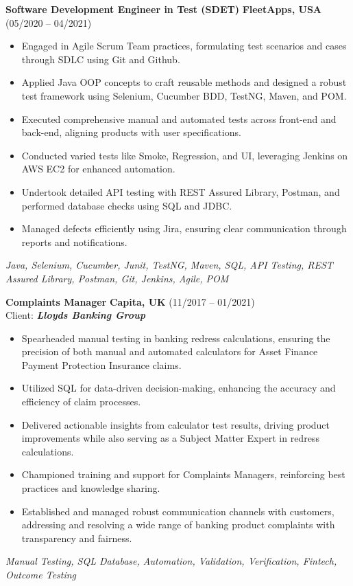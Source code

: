 \documentclass[11pt,a4paper,sans]{moderncv}
\begin{document}
    \noindent \textbf{Software Development Engineer in Test (SDET)} \hfill \textbf{FleetApps, USA} (05/2020 – 04/2021) \\
    \begin{itemize}
        \item Engaged in Agile Scrum Team practices, formulating test scenarios and cases through SDLC using Git and Github.
        \item Applied Java OOP concepts to craft reusable methods and designed a robust test framework using Selenium, Cucumber BDD, TestNG, Maven, and POM.
        \item Executed comprehensive manual and automated tests across front-end and back-end, aligning products with user specifications.
        \item Conducted varied tests like Smoke, Regression, and UI, leveraging Jenkins on AWS EC2 for enhanced automation.
        \item Undertook detailed API testing with REST Assured Library, Postman, and performed database checks using SQL and JDBC.
        \item Managed defects efficiently using Jira, ensuring clear communication through reports and notifications.
    \end{itemize}
    \small \textit{Java, Selenium, Cucumber, Junit, TestNG, Maven, SQL, API Testing, REST Assured Library, Postman, Git, Jenkins, Agile, POM}



    \noindent \textbf{Complaints Manager} \hfill \textbf{Capita, UK} (11/2017 – 01/2021) \\
    \small Client: \textbf{\textit{Lloyds Banking Group}} \\
    \begin{itemize}
        \item Spearheaded manual testing in banking redress calculations, ensuring the precision of both manual and automated calculators for Asset Finance Payment Protection Insurance claims.
        \item Utilized SQL for data-driven decision-making, enhancing the accuracy and efficiency of claim processes.
        \item Delivered actionable insights from calculator test results, driving product improvements while also serving as a Subject Matter Expert in redress calculations.
        \item Championed training and support for Complaints Managers, reinforcing best practices and knowledge sharing.
        \item Established and managed robust communication channels with customers, addressing and resolving a wide range of banking product complaints with transparency and fairness.
    \end{itemize}
    \small \textit{Manual Testing, SQL Database, Automation, Validation, Verification, Fintech, Outcome Testing}
\end{document}
